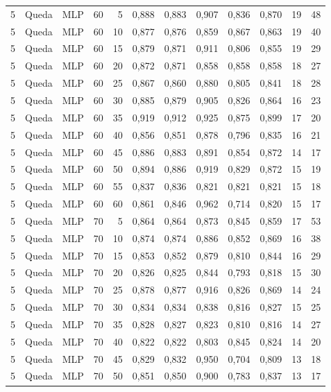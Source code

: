 \begin{longtable}{@{}rllrrrrrrrrr@{}}
5 & Queda & MLP & 60 & 5 & 0,888 & 0,883 & 0,907 & 0,836 & 0,870 & 19 & 48 \\
5 & Queda & MLP & 60 & 10 & 0,877 & 0,876 & 0,859 & 0,867 & 0,863 & 19 & 40 \\
5 & Queda & MLP & 60 & 15 & 0,879 & 0,871 & 0,911 & 0,806 & 0,855 & 19 & 29 \\
5 & Queda & MLP & 60 & 20 & 0,872 & 0,871 & 0,858 & 0,858 & 0,858 & 18 & 27 \\
5 & Queda & MLP & 60 & 25 & 0,867 & 0,860 & 0,880 & 0,805 & 0,841 & 18 & 28 \\
5 & Queda & MLP & 60 & 30 & 0,885 & 0,879 & 0,905 & 0,826 & 0,864 & 16 & 23 \\
5 & Queda & MLP & 60 & 35 & 0,919 & 0,912 & 0,925 & 0,875 & 0,899 & 17 & 20 \\
5 & Queda & MLP & 60 & 40 & 0,856 & 0,851 & 0,878 & 0,796 & 0,835 & 16 & 21 \\
5 & Queda & MLP & 60 & 45 & 0,886 & 0,883 & 0,891 & 0,854 & 0,872 & 14 & 17 \\
5 & Queda & MLP & 60 & 50 & 0,894 & 0,886 & 0,919 & 0,829 & 0,872 & 15 & 19 \\
5 & Queda & MLP & 60 & 55 & 0,837 & 0,836 & 0,821 & 0,821 & 0,821 & 15 & 18 \\
5 & Queda & MLP & 60 & 60 & 0,861 & 0,846 & 0,962 & 0,714 & 0,820 & 15 & 17 \\
5 & Queda & MLP & 70 & 5 & 0,864 & 0,864 & 0,873 & 0,845 & 0,859 & 17 & 53 \\
5 & Queda & MLP & 70 & 10 & 0,874 & 0,874 & 0,886 & 0,852 & 0,869 & 16 & 38 \\
5 & Queda & MLP & 70 & 15 & 0,853 & 0,852 & 0,879 & 0,810 & 0,844 & 16 & 29 \\
5 & Queda & MLP & 70 & 20 & 0,826 & 0,825 & 0,844 & 0,793 & 0,818 & 15 & 30 \\
5 & Queda & MLP & 70 & 25 & 0,878 & 0,877 & 0,916 & 0,826 & 0,869 & 14 & 24 \\
5 & Queda & MLP & 70 & 30 & 0,834 & 0,834 & 0,838 & 0,816 & 0,827 & 15 & 25 \\
5 & Queda & MLP & 70 & 35 & 0,828 & 0,827 & 0,823 & 0,810 & 0,816 & 14 & 27 \\
5 & Queda & MLP & 70 & 40 & 0,822 & 0,822 & 0,803 & 0,845 & 0,824 & 14 & 20 \\
5 & Queda & MLP & 70 & 45 & 0,829 & 0,832 & 0,950 & 0,704 & 0,809 & 13 & 18 \\
5 & Queda & MLP & 70 & 50 & 0,851 & 0,850 & 0,900 & 0,783 & 0,837 & 13 & 17 \\

\end{longtable}
